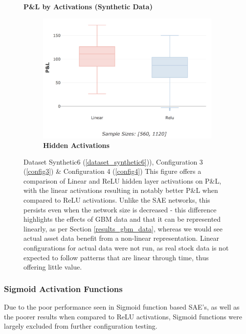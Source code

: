\documentclass[a4paper,11pt,oneside]{article}
\theoremstyle{plain}
\theoremstyle{definition}
\begin{document}
	\begin{figure}[H]
		\centering
		\textbf{P\&L by Activations (Synthetic Data)}

		\begin{subfigure}{.5\textwidth}
			\centering 
			\includegraphics[scale=0.25]{images/results/activations/synth_pl_hidden.png}
			\caption[P\&L by Scaling and Activations (Synthetic Data) - Hidden Activations]{\textbf{Hidden Activations} 
				\newline }
			\label{figure-synth_pl_hidden}
		\end{subfigure}
		\caption[P\&L by Activations (Synthetic Data)]
		{Dataset Synthetic6  (\ref{dataset_synthetic6})), Configuration 3 (\ref{config3}) \& Configuration 4 (\ref{config4})
			\newline This figure offers a comparison of Linear and ReLU hidden layer activations on P\&L, with the linear activations resulting in notably better P\&L when compared to ReLU activations. Unlike the SAE networks, this persists even when the network size is decreased - this difference highlights the effects of GBM data and that it can be represented linearly, as per Section \ref{results_gbm_data}, whereas we would see actual asset data benefit from a non-linear representation. Linear configurations for actual data were not run, as real stock data is not expected to follow patterns that are linear through time, thus offering little value.}
		\label{figure-pl_activations_scaling}
	\end{figure}
	
	\subsubsection{Sigmoid Activation Functions} 
	Due to the poor performance seen in Sigmoid function based SAE's, as well as the poorer results when compared to ReLU activations, Sigmoid functions were largely excluded from further configuration testing.
	
\end{document}
